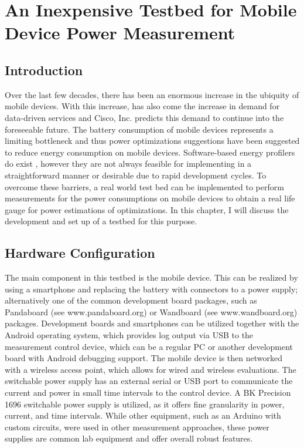 \chapter{An Inexpensive Testbed for Mobile Device Power Measurement} 
\label{ch:testbed}


\section*{Introduction}

Over the last few decades, there has been an enormous increase in the ubiquity of mobile devices. With this increase, has also come the increase in demand for data-driven services and Cisco, Inc. predicts this demand to continue \cite{VNI14} into the foreseeable future. The battery consumption of mobile devices represents a limiting bottleneck and thus  power optimizations suggestions have been suggested \cite{Qian:2012:PTM:2187836.2187844} to reduce energy consumption on mobile devices. Software-based energy profilers do exist \cite{DAmato:2011:EAE:2419622.2419929}, however they are not always feasible for implementing in a straightforward manner or desirable due to rapid development cycles. To overcome these barriers, a real world test bed can be implemented  to perform measurements for the power consumptions on mobile devices to obtain a real life gauge for power estimations of optimizations. In this chapter, I will discuss the development and set up of a testbed for this purpose.

\section*{Hardware Configuration}

The main component in this testbed is the mobile device.
This can be realized by using a smartphone and replacing the
battery with connectors to a power supply; alternatively one
of the common development board packages, such as
Pandaboard (see www.pandaboard.org) or Wandboard (see
www.wandboard.org) packages. Development boards and smartphones can be utilized together with the
Android operating system, which provides log output via USB
to the measurement control device, which can be a regular PC
or another development board with Android debugging
support. The mobile device is then networked with a wireless access point, which allows for wired and wireless evaluations.
The switchable power supply has an external serial or USB
port to communicate the current and power in small time
intervals to the control device. A BK Precision
1696 switchable power supply is utilized, as it offers fine granularity in power, current, and time intervals. While other equipment, such as an Arduino with custom circuits, were used in other measurement approaches, these power supplies are common lab equipment and offer overall robust features.

